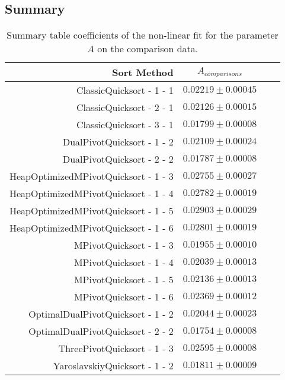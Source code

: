 	\subsection{Summary}
		\begin{table}
			\begin{center}
				\begin{tabular}{|r|c|c|c}
					\hline
									Sort Method              &   $A_{comparisons}$      \\ \hline \hline
					                ClassicQuicksort - 1 - 1 &   $0.02219 \pm  0.00045$ \\ \hline
					                ClassicQuicksort - 2 - 1 &   $0.02126 \pm  0.00015$ \\ \hline
					                ClassicQuicksort - 3 - 1 &   $0.01799 \pm  0.00008$ \\ \hline
					              DualPivotQuicksort - 1 - 2 &   $0.02109 \pm  0.00024$ \\ \hline
					              DualPivotQuicksort - 2 - 2 &   $0.01787 \pm  0.00008$ \\ \hline
					    HeapOptimizedMPivotQuicksort - 1 - 3 &   $0.02755 \pm  0.00027$ \\ \hline
					    HeapOptimizedMPivotQuicksort - 1 - 4 &   $0.02782 \pm  0.00019$ \\ \hline
					    HeapOptimizedMPivotQuicksort - 1 - 5 &   $0.02903 \pm  0.00029$ \\ \hline
					    HeapOptimizedMPivotQuicksort - 1 - 6 &   $0.02801 \pm  0.00019$ \\ \hline
					                 MPivotQuicksort - 1 - 3 &   $0.01955 \pm  0.00010$ \\ \hline
					                 MPivotQuicksort - 1 - 4 &   $0.02039 \pm  0.00013$ \\ \hline
					                 MPivotQuicksort - 1 - 5 &   $0.02136 \pm  0.00013$ \\ \hline
					                 MPivotQuicksort - 1 - 6 &   $0.02369 \pm  0.00012$ \\ \hline
					       OptimalDualPivotQuicksort - 1 - 2 &   $0.02044 \pm  0.00023$ \\ \hline
					       OptimalDualPivotQuicksort - 2 - 2 &   $0.01754 \pm  0.00008$ \\ \hline
					             ThreePivotQuicksort - 1 - 3 &   $0.02595 \pm  0.00008$ \\ \hline
					           YaroslavskiyQuicksort - 1 - 2 &   $0.01811 \pm  0.00009$ \\ \hline
				\end{tabular}
				\caption{Summary table coefficients of the non-linear fit for the parameter $A$ on the comparison data.}
				\label{tab:compFitCoeffA}
			\end{center}
		\end{table}


